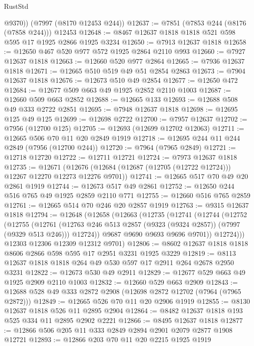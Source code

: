 \begin{lexlean}{RustStd}
\begin{coremodule}
{\begin{coremodule}
{{{{{{{{{{{{{{{{{{{{{{{{{{{{{{{{{{{{{{{{{{{        @9370))
    (@7997 (@8170 @12453 @244))
@12637 := @7851 (@7853 @244 (@8176 (@7858 @244))) @12453
@12648 := @8467 @12637 @1818 @1818 @521 @598 @595 @17 @1925 @2866 @1925 @3234
@12650 := @7913 @12637 @1818
@12658 := @12650 @467 @520 @977 @572 @1925 @2864 @2110 @993
@12660 := @7927 @12637 @1818
@12663 := @12660 @520 @977 @2864
@12665 := @7936 @12637 @1818
@12671 := @12665 @510 @519 @49 @51 @2854 @2863
@12673 := @7904 @12637 @1818
@12676 := @12673 @510 @49 @2854
@12677 := @12650 @472
@12684 := @12677 @509 @663 @49 @1925 @2852 @2110 @1003
@12687 := @12660 @509 @663 @2852
@12688 := @12665 @133
@12693 := @12688 @508 @49 @333 @2722 @2851
@12695 := @7948 @12637 @1818
@12698 := @12695 @125 @49 @125
@12699 := @12698 @2722
@12700 := @7957 @12637
@12702 := @7956 (@12700 @125)
@12705 := @12693 (@12699 @12702 @12063)
@12711 := @12665 @506 @70 @11 @20 @2849 @1919
@12718 := @12695 @244 @11 @244 @2849 (@7956 (@12700 @244))
@12720 := @7964 (@7965 @2849)
@12721 := @12718 @12720
@12722 := @12711 @12721
@12724 := @7973 @12637 @1818
@12735 := @12671
    (@12676 (@12684 (@12687 (@12705 (@12722 @12724))) @12267 @12270 @12273 @12276 @9701))
@12741 := @12665 @517 @70 @49 @20 @2861 @1919
@12744 := @12673 @517 @49 @2861
@12752 := @12650 @244 @516 @765 @49 @1925 @2859 @2110 @771
@12755 := @12660 @516 @765 @2859
@12761 := @12665 @514 @70 @246 @20 @2857 @1919
@12763 := @9315 @12637 @1818
@12794 := @12648
    (@12658
      (@12663
        (@12735
          (@12741
            (@12744
              (@12752
                (@12755
                  (@12761
                    (@12763 @246 @513 @2857 (@9323 (@9324 @2857)) (@7997 (@9329 @513 @246)))
                    @12724))
                @9687
                @9690
                @9693
                @9696
                @9701))
            @12724)))
      @12303
      @12306
      @12309
      @12312
      @9701)
@12806 := @8602 @12637 @1818 @1818 @8606 @2866 @598 @595 @17 @2951 @3231 @1925 @3229
@12819 := @8113 @12637 @1818 @1818 @264 @49 @530 @597 @17 @2911 @264 @2678 @2950 @3231
@12822 := @12673 @530 @49 @2911
@12829 := @12677 @529 @663 @49 @1925 @2909 @2110 @1003
@12832 := @12660 @529 @663 @2909
@12843 := @12688 @528 @49 @333 @2872 @2908 (@12698 @2872 @12702 (@7964 (@7965 @2872)))
@12849 := @12665 @526 @70 @11 @20 @2906 @1919
@12855 := @8130 @12637 @1818 @526 @11 @2895 @2904
@12864 := @8482 @12637 @1818 @193 @525 @334 @11 @2895 @2902 @2221
@12866 := @8495 @12637 @1818
@12877 := @12866 @506 @205 @11 @333 @2849 @2894 @2901 @2079 @2877 @1908 @12721
@12893 := @12866
    @203
    @70
    @11
    @20
    @2215
    @1925
    @1919
}}}}}}}}}}}}}}}}}}}}}}}}}}}}}}}}}}}}}}}}}}}
\end{coremodule}}
\end{coremodule}
\end{lexlean}
